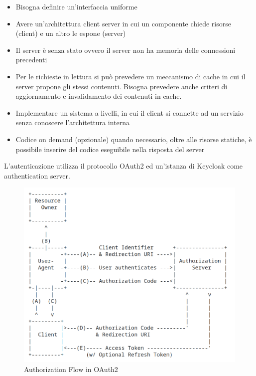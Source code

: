 \documentclass[a4paper,11pt]{article}
\begin{document}
\begin{itemize}
  \item Bisogna definire un'interfaccia uniforme
  \item Avere un'architettura client server in cui un componente chiede risorse (client) e un altro le espone (server)
  \item Il server è senza stato ovvero il server non ha memoria delle connessioni precedenti
  \item Per le richieste in lettura si può prevedere un meccanismo di cache in cui il server propone gli stessi contenuti. Bisogna prevedere anche criteri di aggiornamento e invalidamento dei contenuti in cache.
  \item Implementare un sistema a livelli, in cui il client si connette ad un servizio senza conoscere l'architettura interna
  \item Codice on demand (opzionale) quando necessario, oltre alle risorse statiche, è possibile inserire del codice eseguibile nella risposta del server
\end{itemize}

L'autenticazione utilizza il protocollo OAuth2 ed un'istanza di Keycloak come authentication server. \cite{ietf6749OAuth}

\begin{figure}[H]
  \includegraphics[width=1\linewidth]{img/image-1.png}
  \caption{Authorization Flow in OAuth2 \cite{ietf6749OAuth}}
  \label{fig:authorizationoauth2}
\end{figure}
\end{document}
